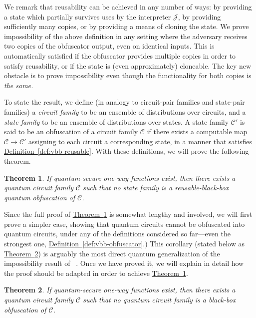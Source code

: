 \documentclass[11pt]{article}
\numberwithin{equation}{section}
\newtheorem{theorem}{Theorem}
\newcommand{\expref}[2]{\texorpdfstring{\hyperref[#2]{#1~\ref{#2}}}{#1~\ref{#2}}}
\newcommand{\algo}{\mathcal}
\begin{document}
{We remark that reusability can be achieved in any number of ways: by providing a state which partially survives uses by the interpreter $\algo J$, by providing sufficiently many copies, or by providing a means of cloning the state. We prove impossibility of the above definition in any setting where the adversary receives two copies of the obfuscator output, even on identical inputs. This is automatically satisfied if the obfuscator provides multiple copies in order to satisfy reusability, or if the state is (even approximately) cloneable. The key new obstacle is to prove impossibility even though the functionality for both copies is \emph{the same.}

To state the result, we define (in analogy to circuit-pair families and state-pair families) a \emph{circuit family} to be an ensemble of distributions over circuits, and a \emph{state family} to be an ensemble of distributions over states. A state family $\mathcal C'$ is said to be an obfuscation of a circuit family $\mathcal C$ if there exists a computable map $\mathcal C \rightarrow \mathcal C'$ assigning to each circuit a corresponding state, in a manner that satisfies \expref{Definition}{def:vbb-reusable}. With these definitions, we will prove the following theorem.

\begin{theorem}\label{thm:single-impossibility}
If quantum-secure one-way functions exist, then there exists a quantum circuit family $\mathcal C$ such that no state family is a reusable-black-box quantum obfuscation of $\mathcal C$.
\end{theorem}

Since the full proof of \expref{Theorem}{thm:single-impossibility} is somewhat lengthy and involved, we will first prove a simpler case, showing that quantum circuits cannot be obfuscated into quantum circuits, under any of the definitions considered so far---even the strongest one, \expref{Definition}{def:vbb-obfuscator}.) This corollary (stated below as \expref{Theorem}{thm:cor}) is arguably the most direct quantum generalization of the impossibility result of ~\cite{BGIRSVY01}. Once we have proved it, we will explain in detail how the proof should be adapted in order to achieve \expref{Theorem}{thm:single-impossibility}.

\begin{theorem}\label{thm:cor}
If quantum-secure one-way functions exist, then there exists a quantum circuit family $\mathcal C$ such that no quantum circuit family is a black-box obfuscation of $\mathcal C$.
\end{theorem}


}
\end{document}
